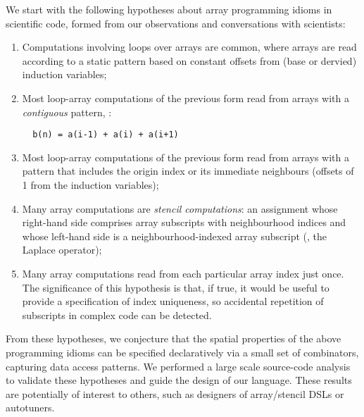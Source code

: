 
\noindent
We start with the following hypotheses about array programming idioms
in scientific code, formed from our observations and conversations
with scientists:
\begin{enumerate}[leftmargin=2em]
\item Computations involving loops over arrays are common, where
  arrays are read according to a static pattern based on constant offsets
  from (base or dervied) induction variables;

\item Most loop-array computations of the previous form read from
  arrays with a \emph{contiguous} pattern, \eg{}:
%
\begin{verbatim}
  b(n) = a(i-1) + a(i) + a(i+1)
\end{verbatim}
%
\item Most loop-array computations of the previous form read from
  arrays with a pattern that includes the origin index or its
  immediate neighbours (offsets of 1 from the induction variables);

\item Many array computations are \emph{stencil computations}: an
  assignment whose right-hand side comprises array subscripts with
  neighbourhood indices and whose left-hand side is a
  neighbourhood-indexed array subscript (\eg{}, the Laplace operator);

\item Many array computations read from each particular array index just
  once. The significance of this hypothesis is that, if true, it would
  be useful to provide a specification of index uniqueness, so accidental
  repetition of subscripts in complex code can be detected.
\end{enumerate}
%
From these hypotheses, we conjecture that the spatial properties of
the above programming idioms can be specified declaratively via a
small set of combinators, capturing data access patterns. %
We performed a large scale source-code analysis to validate these
hypotheses and guide the design of our language. These results are
potentially of interest to others, such as designers of array/stencil DSLs
or autotuners.


